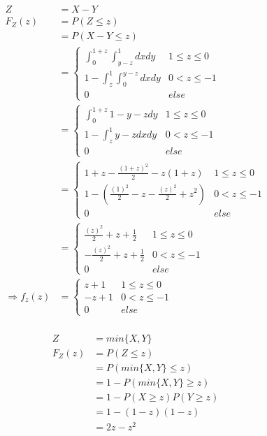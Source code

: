 \documentclass[12pt,a4paper]{article}
\begin{document}
\begin{align*}
Z &= X - Y\\
F_Z(z) &= P(Z \leq z)\\
&= P(X - Y\leq z)\\
&= \begin{cases}
\int^{1 + z}_0\int^{1}_{y - z} dx dy & 1 \leq z \leq 0\\
1 - \int^{1}_{z}\int^{y - z}_{0} dx dy & 0 < z \leq -1\\
0 & else
\end{cases}\\
&= \begin{cases}
\int^{1 + z}_0 1 - y - z dy & 1 \leq z \leq 0\\
1 - \int^{1}_{z} y - z dx dy & 0 < z \leq -1\\
0 & else
\end{cases}\\
&= \begin{cases}
1 + z - \frac{(1+z)^2}{2} - z(1 + z) & 1 \leq z \leq 0\\
1 - (\frac{(1)^2}{2} - z - \frac{(z)^2}{2} + z^2) & 0 < z \leq -1\\
0 & else
\end{cases}\\
&= \begin{cases}
\frac{(z)^2}{2} + z + \frac{1}{2} & 1 \leq z \leq 0\\
- \frac{(z)^2}{2} + z + \frac{1}{2} & 0 < z \leq -1\\
0 & else
\end{cases}\\
\Rightarrow f_z(z) &= \begin{cases}
z + 1 & 1 \leq z \leq 0\\
- z + 1 & 0 < z \leq -1\\
0 & else
\end{cases}\\
\end{align*}

\begin{align*}
Z &= min\lbrace X, Y \rbrace\\
F_Z(z) &= P(Z \leq z)\\
&= P(min\lbrace X, Y \rbrace\leq z)\\
&= 1 - P(min\lbrace X, Y \rbrace\geq z)\\
&= 1 - P(X \geq z)P(Y \geq z)\\
&= 1 - (1 - z)(1 - z)\\
&= 2z - z^2
\end{align*}
\end{document}
